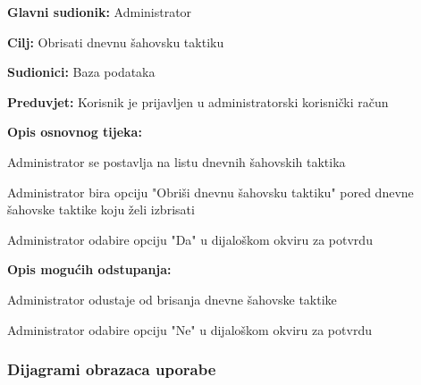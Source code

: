 		\noindent {}
		\begin{packed_item}
			
			\item \textbf{Glavni sudionik: } Administrator
			\item  \textbf{Cilj: } Obrisati dnevnu šahovsku taktiku
			\item  \textbf{Sudionici: } Baza podataka
			\item  \textbf{Preduvjet: } Korisnik je prijavljen u administratorski korisnički račun
			\item  \textbf{Opis osnovnog tijeka:}
			
			\item[] \begin{packed_enum}
				
				\item Administrator se postavlja na listu dnevnih šahovskih taktika
				\item Administrator bira opciju "Obriši dnevnu šahovsku taktiku" pored dnevne šahovske taktike koju želi izbrisati
				\item Administrator odabire opciju "Da" u dijaloškom okviru za potvrdu
			\end{packed_enum}
			
			\item  \textbf{Opis mogućih odstupanja:}
			
			\item[] \begin{packed_item}
				
				\item[2.a] Administrator odustaje od brisanja dnevne šahovske taktike
				\item[] \begin{packed_enum}
					
					\item Administrator odabire opciju "Ne" u dijaloškom okviru za potvrdu
					
				\end{packed_enum}
			\end{packed_item}
			
		\end{packed_item}
	
		
	
				\subsubsection{Dijagrami obrazaca uporabe}
					
